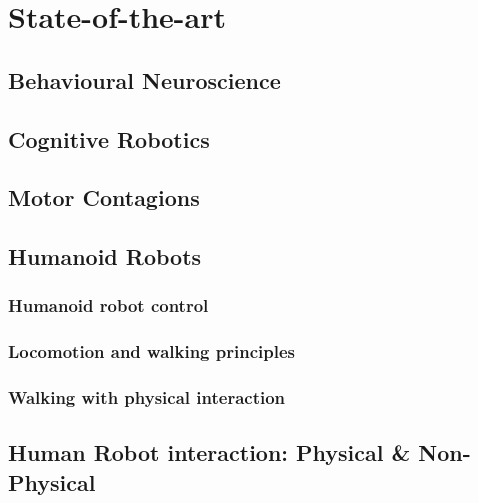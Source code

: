 \documentclass[a4paper, 12pt, oneside]{Thesis}  %
\begin{document}
\chapter{State-of-the-art}




\section{Behavioural Neuroscience}

\clearpage
\section{Cognitive Robotics}

\clearpage
\section{Motor Contagions}

\clearpage
\section{Humanoid Robots}
\subsection{Humanoid robot control}
\subsection{Locomotion and walking principles}
\subsection{Walking with physical interaction}

\clearpage
\section{Human Robot interaction: Physical \& Non-Physical}

\end{document}
